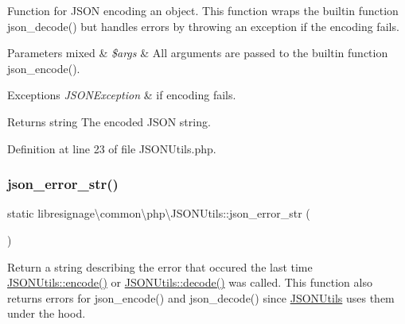 Function for J\+S\+ON encoding an object. This function wraps the builtin function json\+\_\+decode() but handles errors by throwing an exception if the encoding fails.


\begin{DoxyParams}[1]{Parameters}
mixed & {\em \$args} & All arguments are passed to the builtin function json\+\_\+encode(). \\
\hline
\end{DoxyParams}

\begin{DoxyExceptions}{Exceptions}
{\em J\+S\+O\+N\+Exception} & if encoding fails. \\
\hline
\end{DoxyExceptions}
\begin{DoxyReturn}{Returns}
string The encoded J\+S\+ON string. 
\end{DoxyReturn}


Definition at line 23 of file J\+S\+O\+N\+Utils.\+php.

\mbox{\label{classlibresignage_1_1common_1_1php_1_1JSONUtils_a6f48ed7ad6f9656ced866a79f9e63aef}} 
\subsubsection{\texorpdfstring{json\+\_\+error\+\_\+str()}{json\_error\_str()}}
{\footnotesize\ttfamily static libresignage\textbackslash{}common\textbackslash{}php\textbackslash{}\+J\+S\+O\+N\+Utils\+::json\+\_\+error\+\_\+str (\begin{DoxyParamCaption}{ }\end{DoxyParamCaption})\hspace{0.3cm}{\ttfamily [static]}}

Return a string describing the error that occured the last time \hyperlink{classlibresignage_1_1common_1_1php_1_1JSONUtils_afba0c427cdb9c845a0090fe345e389b3}{J\+S\+O\+N\+Utils\+::encode()} or \hyperlink{classlibresignage_1_1common_1_1php_1_1JSONUtils_a73a322b0d95e27f7d4369fa29a7234f2}{J\+S\+O\+N\+Utils\+::decode()} was called. This function also returns errors for json\+\_\+encode() and json\+\_\+decode() since \hyperlink{classlibresignage_1_1common_1_1php_1_1JSONUtils}{J\+S\+O\+N\+Utils} uses them under the hood.

